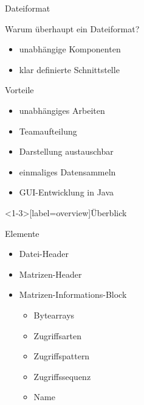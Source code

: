 \begin{frame}{Dateiformat}
	\begin{block}{Warum überhaupt ein Dateiformat?}
		\begin{itemize}
			\pause
			\item unabhängige Komponenten
			\item klar definierte Schnittstelle
		\end{itemize}
	\end{block}
	\pause
	\begin{block}{Vorteile}
		\begin{itemize}
			\pause
			\item unabhängiges Arbeiten
			\item Teamaufteilung
			\pause
			\item Darstellung austauschbar
			\item einmaliges Datensammeln
			\pause
			\item GUI-Entwicklung in Java
		\end{itemize}
	\end{block}
\end{frame}

\begin{frame}<1-3>[label=overview]{Überblick}
	\begin{block}{Elemente}
		\begin{itemize}
			\pause
			\item Datei-Header
			\pause
			\item Matrizen-Header
			\pause
			\item Matrizen-Informations-Block
			\pause
			\begin{itemize}
				\item Bytearrays
				\pause
				\item Zugriffsarten
				\pause
				\item Zugriffspattern
				\pause
				\item Zugriffssequenz
				\pause
				\item Name
			\end{itemize}
		\end{itemize}
	\end{block}
\end{frame}

